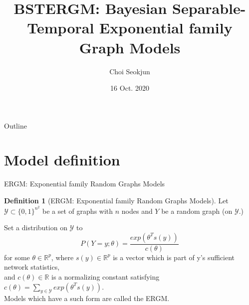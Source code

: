 \documentclass[aspectratio=169,ignorenonframetext,9pt]{beamer}
\title{BSTERGM: Bayesian Separable-Temporal Exponential family Graph Models}
\author{Choi Seokjun}
\date{16 Oct. 2020}
\theoremstyle{plain}
\theoremstyle{definition}
\newtheorem{defn}{Definition}[section]
\begin{document}
\begin{frame}
\maketitle
\end{frame}




\begin{frame}{Outline}
\tableofcontents
\end{frame}



\section{Model definition}
\begin{frame}{ERGM: Exponential family Random Graphs Models}
    \begin{defn}[ERGM: Exponential family Random Graphs Models]
        Let $\mathcal{Y} \subset \{0,1\}^{n^2}$ be a set of graphs with $n$ nodes and $Y$ be a random graph (on $\mathcal{Y}$.)
        
        Set a distribution on $\mathcal{Y}$ to
        \[P(Y=y;\theta) = \frac{exp(\theta^{T}s(y))}{c(\theta)}\]
        for some $\theta\in\mathbb{R}^p$,
        where $s(y)\in\mathbb{R}^p$ is a vector which is part of y's sufficient network statistics,
        \\ and $c(\theta)\in\mathbb{R}$ is a normalizing constant satisfying $c(\theta)=\sum_{y\in\mathcal{Y}}exp(\theta^{T}s(y))$.
        \\ Models which have a such form are called the ERGM.
    \end{defn}
\end{frame}
\end{document}
